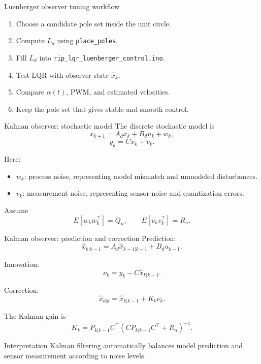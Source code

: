 \documentclass[aspectratio=169]{beamer}
\begin{document}
\begin{frame}{Luenberger observer tuning workflow}
\begin{enumerate}
    \item Choose a candidate pole set inside the unit circle.
    \vspace{0.2cm}
    \item Compute \(L_d\) using \texttt{place\_poles}.
    \vspace{0.2cm}
    \item Fill \(L_d\) into \texttt{rip\_lqr\_luenberger\_control.ino}.
    \vspace{0.2cm}
    \item Test LQR with observer state \(\hat{x}_k\).
    \vspace{0.2cm}
    \item Compare \(\alpha(t)\), PWM, and estimated velocities.
    \vspace{0.2cm}
    \item Keep the pole set that gives stable and smooth control.
\end{enumerate}
\end{frame}

\begin{frame}{Kalman observer: stochastic model}
The discrete stochastic model is
\[
x_{k+1}=A_dx_k+B_du_k+w_k,
\]
\[
y_k=Cx_k+v_k.
\]

\vspace{0.15cm}
Here:
\begin{itemize}
    \item \(w_k\): process noise, representing model mismatch and unmodeled disturbances.
    \vspace{0.15cm}
    \item \(v_k\): measurement noise, representing sensor noise and quantization errors.
\end{itemize}

\vspace{0.15cm}
Assume
\[
E[w_kw_k^\top]=Q_n,
\qquad
E[v_kv_k^\top]=R_n.
\]
\end{frame}

\begin{frame}{Kalman observer: prediction and correction}
Prediction:
\[
\hat{x}_{k|k-1}=A_d\hat{x}_{k-1|k-1}+B_du_{k-1}.
\]

Innovation:
\[
\nu_k=y_k-C\hat{x}_{k|k-1}.
\]

Correction:
\[
\hat{x}_{k|k}=\hat{x}_{k|k-1}+K_k\nu_k.
\]

\vspace{0.2cm}
The Kalman gain is
\[
K_k=P_{k|k-1}C^\top(CP_{k|k-1}C^\top+R_n)^{-1}.
\]

\vspace{0.1cm}
\begin{block}{Interpretation}
\small
Kalman filtering automatically balances model prediction and sensor measurement according to noise levels.
\end{block}
\end{frame}
\end{document}
